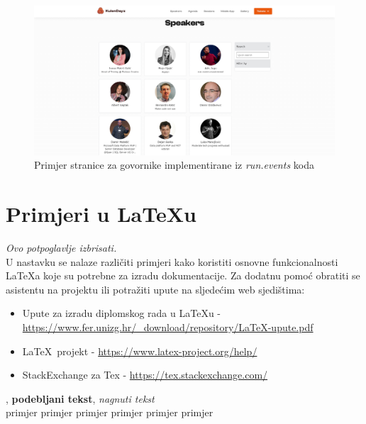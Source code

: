 		\begin{figure}
			\centering
			\includegraphics[width=1\linewidth]{slike/kulen-speakers.png}
			\caption{Primjer stranice za govornike implementirane iz \textit{run.events} koda}
			\label{fig:kulen-speakers}
		\end{figure}
		
		\eject
		
		\section{Primjeri u \LaTeX u}
		
		\textit{Ovo potpoglavlje izbrisati.}\\

		U nastavku se nalaze različiti primjeri kako koristiti osnovne funkcionalnosti \LaTeX a koje su potrebne za izradu dokumentacije. Za dodatnu pomoć obratiti se asistentu na projektu ili potražiti upute na sljedećim web sjedištima:
		\begin{itemize}
			\item Upute za izradu diplomskog rada u \LaTeX u - \url{https://www.fer.unizg.hr/_download/repository/LaTeX-upute.pdf}
			\item \LaTeX\ projekt - \url{https://www.latex-project.org/help/}
			\item StackExchange za Tex - \url{https://tex.stackexchange.com/}\\
		
		\end{itemize} 	


		
		\noindent {}, \textbf{podebljani tekst}, 	\textit{nagnuti tekst}\\
		\noindent \normalsize primjer \large primjer \Large primjer \LARGE {primjer} \huge {primjer} \Huge primjer \normalsize
				
